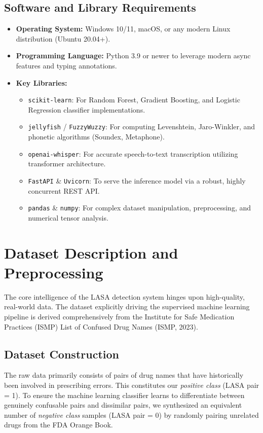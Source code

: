 \documentclass[12pt,a4paper]{report}
\begin{document}
\subsection{Software and Library Requirements}
\begin{itemize}
    \item \textbf{Operating System:} Windows 10/11, macOS, or any modern Linux distribution (Ubuntu 20.04+).
    \item \textbf{Programming Language:} Python 3.9 or newer to leverage modern async features and typing annotations.
    \item \textbf{Key Libraries:}
    \begin{itemize}
        \item \texttt{scikit-learn}: For Random Forest, Gradient Boosting, and Logistic Regression classifier implementations.
        \item \texttt{jellyfish} / \texttt{FuzzyWuzzy}: For computing Levenshtein, Jaro-Winkler, and phonetic algorithms (Soundex, Metaphone).
        \item \texttt{openai-whisper}: For accurate speech-to-text transcription utilizing transformer architecture.
        \item \texttt{FastAPI} \& \texttt{Uvicorn}: To serve the inference model via a robust, highly concurrent REST API.
        \item \texttt{pandas} \& \texttt{numpy}: For complex dataset manipulation, preprocessing, and numerical tensor analysis.
    \end{itemize}
\end{itemize}

\section{Dataset Description and Preprocessing}
The core intelligence of the LASA detection system hinges upon high-quality, real-world data. The dataset explicitly driving the supervised machine learning pipeline is derived comprehensively from the Institute for Safe Medication Practices (ISMP) List of Confused Drug Names (ISMP, 2023).

\subsection{Dataset Construction}
The raw data primarily consists of pairs of drug names that have historically been involved in prescribing errors. This constitutes our \textit{positive class} (LASA pair = 1). To ensure the machine learning classifier learns to differentiate between genuinely confusable pairs and dissimilar pairs, we synthesized an equivalent number of \textit{negative class} samples (LASA pair = 0) by randomly pairing unrelated drugs from the FDA Orange Book.
\end{document}
